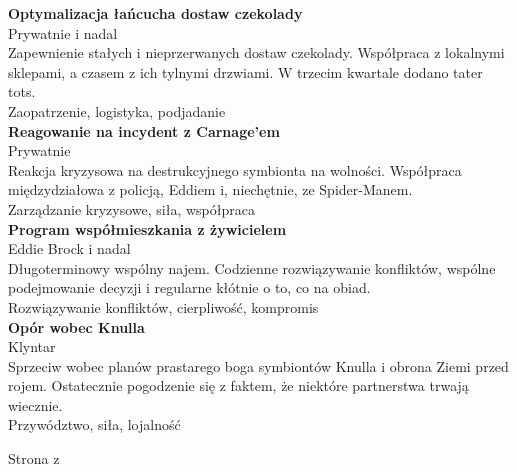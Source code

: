 \documentclass[oneside]{article}
\renewcommand{\scshape}{}
\begin{document}
{\begin{minipage}[t][\dimexpr\textheight-2\fboxrule-2\fboxsep\relax][t]{\dimexpr0.6\textwidth-2\fboxrule-2\fboxsep\relax}
\begin{justify}
        {\large \textbf{Optymalizacja łańcucha dostaw czekolady}} \\
        {\scshape\footnotesize Prywatnie  i nadal} \\
        Zapewnienie stałych i nieprzerwanych dostaw czekolady. Współpraca z lokalnymi sklepami, a czasem z ich tylnymi drzwiami. W trzecim kwartale dodano tater tots. \\[1ex]
        Zaopatrzenie, logistyka, podjadanie \\
        
        {\large \textbf{Reagowanie na incydent z Carnage'em}} \\
        {\scshape\footnotesize Prywatnie } \\
        Reakcja kryzysowa na destrukcyjnego symbionta na wolności. Współpraca międzydziałowa z policją, Eddiem i, niechętnie, ze Spider-Manem. \\[1ex]
        Zarządzanie kryzysowe, siła, współpraca \\
        
        {\large \textbf{Program współmieszkania z żywicielem}} \\
        {\scshape\footnotesize Eddie Brock  i nadal} \\
        Długoterminowy wspólny najem. Codzienne rozwiązywanie konfliktów, wspólne podejmowanie decyzji i regularne kłótnie o to, co na obiad. \\[1ex]
        Rozwiązywanie konfliktów, cierpliwość, kompromis \\
        
        {\large \textbf{Opór wobec Knulla}} \\
        {\scshape\footnotesize Klyntar } \\
        Sprzeciw wobec planów prastarego boga symbiontów Knulla i obrona Ziemi przed rojem. Ostatecznie pogodzenie się z faktem, że niektóre partnerstwa trwają wiecznie. \\[1ex]
        Przywództwo, siła, lojalność
        \end{justify}
        \vfill%
        {\hfill\small Strona \thepage{} z \pageref{LastPage}\hfill}
    \end{minipage}
}
\hfill%
\end{document}
